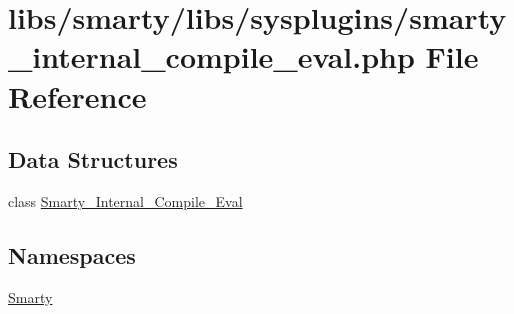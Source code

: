 \hypertarget{smarty__internal__compile__eval_8php}{}\section{libs/smarty/libs/sysplugins/smarty\+\_\+internal\+\_\+compile\+\_\+eval.php File Reference}
\label{smarty__internal__compile__eval_8php}
\subsection*{Data Structures}
\begin{DoxyCompactItemize}
\item 
class \hyperlink{class_smarty___internal___compile___eval}{Smarty\+\_\+\+Internal\+\_\+\+Compile\+\_\+\+Eval}
\end{DoxyCompactItemize}
\subsection*{Namespaces}
\begin{DoxyCompactItemize}
\item 
 \hyperlink{namespace_smarty}{Smarty}
\end{DoxyCompactItemize}
